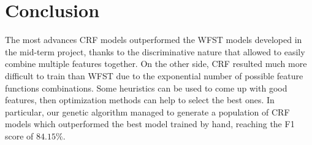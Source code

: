 \section{Conclusion}
\label{sec:conclusion}
The most advances \ac{CRF} models outperformed the \ac{WFST} models developed in the mid-term project, thanks to the discriminative nature that allowed to easily combine multiple features together.
On the other side, \ac{CRF} resulted much more difficult to train than \ac{WFST} due to the exponential number of possible feature functions combinations.
Some heuristics can be used to come up with good features, then optimization methods can help to select the best ones.
In particular, our genetic algorithm managed to generate a population of \ac{CRF} models which outperformed the best model trained by hand, reaching the F1 score of $84.15\%$.
